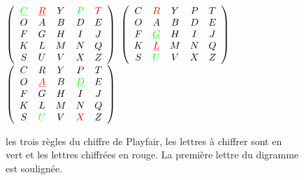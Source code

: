 \begin{figure}[h]
  $
  \left(
    \begin{array}{ccccc}
      \textcolor{green}{\underline{C}} & \textcolor{red}{\underline{R}} & Y & \textcolor{green}{P} & \textcolor{red}{T} \\
      O & A & B & D & E \\
      F & G & H & I & J \\
      K & L & M & N & Q \\
      S & U & V & X & Z
    \end{array}
  \right)
  $
  \hfill
  $
  \left(
    \begin{array}{ccccc}
      C & \textcolor{red}{R} & Y & P & T \\
      O & A & B & D & E \\
      F & \textcolor{green}{\underline{G}} & H & I & J \\
      K & \textcolor{red}{\underline{L}} & M & N & Q \\
      S & \textcolor{green}{U} & V & X & Z
    \end{array}
  \right)
  $
  \hfill
  $
  \left(
    \begin{array}{ccccc}
      C & R & Y & P & T \\
      O & \textcolor{red}{\underline{A}} & B & \textcolor{green}{\underline{D}} & E \\
      F & G & H & I & J \\
      K & L & M & N & Q \\
      S & \textcolor{green}{U} & V & \textcolor{red}{X} & Z
    \end{array}
  \right)
  $
  \caption{les trois règles du chiffre de Playfair, les lettres à
    chiffrer sont en vert et les lettres chiffrées en rouge. La
    première lettre du digramme est soulignée.}
  \label{fig:Playfair}
\end{figure}

